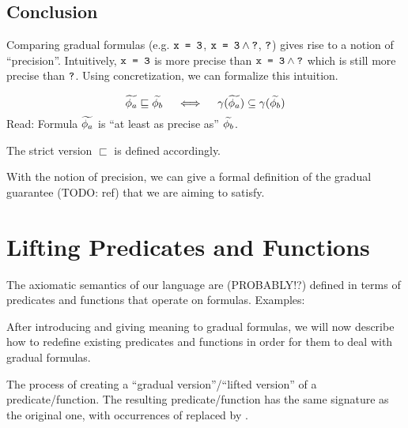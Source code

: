 
\subsection{Conclusion}
Comparing gradual formulas (e.g. $\texttt{x = 3}$, $\texttt{x = 3$\:\wedge\:$\texttt{?}}$, $\texttt{?}$) gives rise to a notion of “precision”.
Intuitively, $\texttt{x = 3}$ is more precise than $\texttt{x = 3$\:\wedge\:$\texttt{?}}$ which is still more precise than $\texttt{?}$.
Using concretization, we can formalize this intuition.
\begin{definition}
    $$\widetilde{\phi_a} \sqsubseteq \widetilde{\phi_b}  \quad\iff\quad  \gamma(\widetilde{\phi_a}) \subseteq \gamma(\widetilde{\phi_b})$$
    Read: Formula $\widetilde{\phi_a}$ is “at least as precise as” $\widetilde{\phi_b}$.
\end{definition}
The strict version $\sqsubset$ is defined accordingly.

With the notion of precision, we can give a formal definition of the gradual guarantee (TODO: ref) that we are aiming to satisfy.
\begin{definition}
\label{grad-guarantee-def}
\end{definition}


\section{Lifting Predicates and Functions}
The axiomatic semantics of our language are (PROBABLY!?) defined in terms of predicates and functions that operate on formulas.
Examples:

After introducing and giving meaning to gradual formulas, we will now describe how to redefine existing predicates and functions in order for them to deal with gradual formulas.

\begin{definition}
    The process of creating a “gradual version”/“lifted version” of a predicate/function.
    The resulting predicate/function has the same signature as the original one, with occurrences of \setFormula replaced by \setGFormula.
\end{definition}

